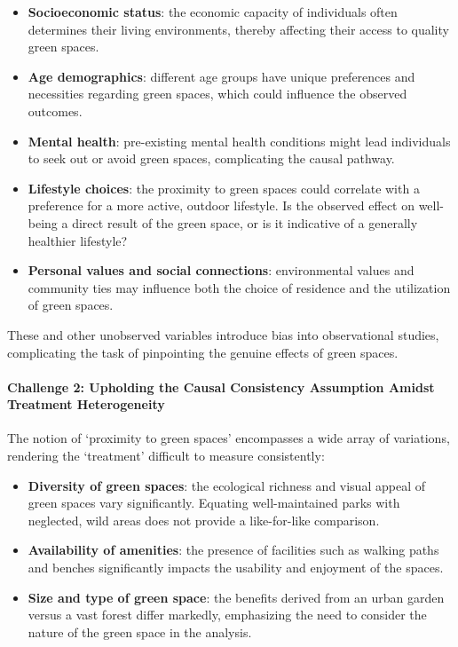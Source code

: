 \documentclass[
  singlecolumn]{article}
\let\oldparagraph\paragraph
\renewcommand{\paragraph}[1]{\oldparagraph{#1}\mbox{}}
\providecommand{\tightlist}{%
  \setlength{\itemsep}{0pt}\setlength{\parskip}{0pt}}\usepackage{longtable,booktabs,array}
\begin{document}
\begin{itemize}
\tightlist
\item
  \textbf{Socioeconomic status}: the economic capacity of individuals
  often determines their living environments, thereby affecting their
  access to quality green spaces.
\item
  \textbf{Age demographics}: different age groups have unique
  preferences and necessities regarding green spaces, which could
  influence the observed outcomes.
\item
  \textbf{Mental health}: pre-existing mental health conditions might
  lead individuals to seek out or avoid green spaces, complicating the
  causal pathway.
\item
  \textbf{Lifestyle choices}: the proximity to green spaces could
  correlate with a preference for a more active, outdoor lifestyle. Is
  the observed effect on well-being a direct result of the green space,
  or is it indicative of a generally healthier lifestyle?
\item
  \textbf{Personal values and social connections}: environmental values
  and community ties may influence both the choice of residence and the
  utilization of green spaces.
\end{itemize}

These and other unobserved variables introduce bias into observational
studies, complicating the task of pinpointing the genuine effects of
green spaces.

\paragraph{Challenge 2: Upholding the Causal Consistency Assumption
Amidst Treatment
Heterogeneity}\label{challenge-2-upholding-the-causal-consistency-assumption-amidst-treatment-heterogeneity}

The notion of `proximity to green spaces' encompasses a wide array of
variations, rendering the `treatment' difficult to measure consistently:

\begin{itemize}
\tightlist
\item
  \textbf{Diversity of green spaces}: the ecological richness and visual
  appeal of green spaces vary significantly. Equating well-maintained
  parks with neglected, wild areas does not provide a like-for-like
  comparison.
\item
  \textbf{Availability of amenities}: the presence of facilities such as
  walking paths and benches significantly impacts the usability and
  enjoyment of the spaces.
\item
  \textbf{Size and type of green space}: the benefits derived from an
  urban garden versus a vast forest differ markedly, emphasizing the
  need to consider the nature of the green space in the analysis.
\end{itemize}
\end{document}
